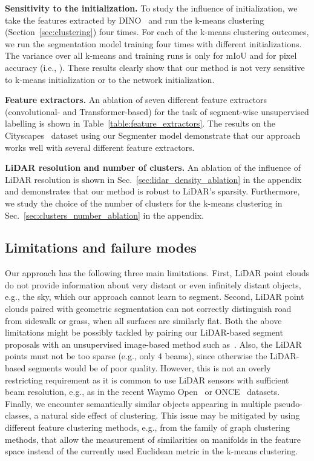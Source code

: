 \documentclass[runningheads]{llncs}
\newcommand{\supp}{appendix\xspace}
\newcommand{\paragraphcustom}[1]{\smallskip\noindent\textbf{#1}}
\begin{document}
\paragraphcustom{Sensitivity to the initialization.}
To study the influence of initialization, we take the features extracted by DINO~\cite{caron2021emerging} and run the k-means clustering (Section~\ref{sec:clustering}) four times. 
For each of the k-means clustering outcomes, we run the segmentation model training four times with different initializations.
The variance over all k-means and training runs is only  for mIoU and  for pixel accuracy (i.e., ).
These results clearly show that our method is not very sensitive to k-means initialization or to the network initialization.

\paragraphcustom{Feature extractors.} 
An ablation of seven different feature extractors (convolutional- and Transformer-based) for the task of segment-wise unsupervised labelling is shown in Table~\ref{table:feature_extractors}. 
The results on the Cityscapes~\cite{Cordts2016Cityscapes} dataset using our Segmenter model demonstrate that our approach works well with several different feature extractors.

\paragraphcustom{LiDAR resolution and number of clusters.}
An ablation of the influence of LiDAR resolution is shown in Sec.~\ref{sec:lidar_density_ablation} in the 
\supp
and demonstrates that our method is robust to LiDAR’s sparsity.
Furthermore, we study the choice of the number of clusters for the k-means clustering in Sec.~\ref{sec:clusters_number_ablation} in the 
\supp.

\vspace{-5pt}
\subsection{Limitations and failure modes}
Our approach has the following three main limitations.
First, LiDAR point clouds do not provide information about very distant or even infinitely distant objects, e.g., the sky, which our approach cannot learn to segment.
Second, LiDAR point clouds paired with geometric segmentation can not correctly distinguish road from sidewalk or grass, when all surfaces are similarly flat. Both the above limitations might be possibly tackled by pairing our LiDAR-based segment proposals with an unsupervised image-based method such as~\cite{felzenszwalb2004efficient}. 
Also, the LiDAR points must not be too sparse (e.g., 
only 4 beams), since otherwise the LiDAR-based segments would be of poor quality. However, this is not an overly restricting requirement as it is common 
to use LiDAR sensors with sufficient beam resolution, e.g., as in the recent Waymo Open~\cite{sun2020scalability} or ONCE~\cite{mao2021one} datasets.
Finally, we encounter semantically similar objects appearing in multiple pseudo-classes, a natural side effect of clustering. This issue may be mitigated by using different feature clustering methods, e.g., from the family of graph clustering methods, that allow the measurement of similarities on manifolds in the feature space instead of the currently used Euclidean metric in the k-means clustering. 
\vspace{-8pt}
\end{document}
